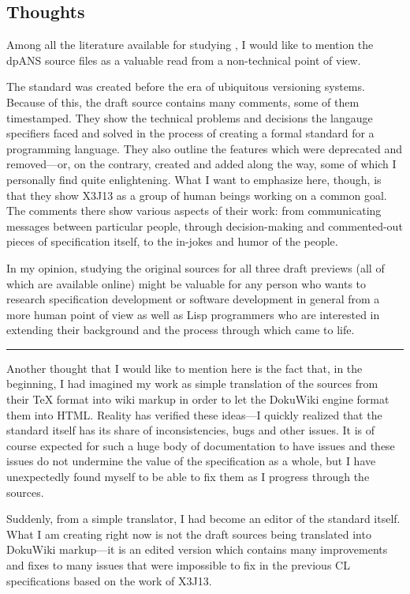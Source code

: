 \subsection{Thoughts}

Among all the literature available for studying \cl{}, I would like to mention the dpANS source files as a valuable read from a non-technical point of view.

The standard was created before the era of ubiquitous versioning systems. Because of this, the draft source contains many comments, some of them timestamped. They show the technical problems and decisions the langauge specifiers faced and solved in the process of creating a formal standard for a programming language. They also outline the features which were deprecated and removed---or, on the contrary, created and added along the way, some of which I personally find quite enlightening. What I want to emphasize here, though, is that they show X3J13 as a group of human beings working on a common goal. The comments there show various aspects of their work: from communicating messages between particular people, through decision-making and commented-out pieces of specification itself, to the in-jokes and humor of the people.

In my opinion, studying the original sources for all three draft previews (all of which are available online) might be valuable for any person who wants to research specification development or software development in general from a more human point of view as well as Lisp programmers who are interested in extending their background and the process through which \cl{} came to life.

\noindent\rule{\linewidth}{0.5pt}

Another thought that I would like to mention here is the fact that, in the beginning, I had imagined my work as simple translation of the sources from their \TeX{} format into wiki markup in order to let the DokuWiki engine format them into HTML. Reality has verified these ideas---I quickly realized that the standard itself has its share of inconsistencies, bugs and other issues. It is of course expected for such a huge body of documentation to have issues and these issues do not undermine the value of the specification as a whole, but I have unexpectedly found myself to be able to fix them as I progress through the sources.

Suddenly, from a simple translator, I had become an editor of the \cl{} standard itself. What I am creating right now is not the draft sources being translated into DokuWiki markup---it is an edited version which contains many improvements and fixes to many issues that were impossible to fix in the previous CL specifications based on the work of X3J13.

